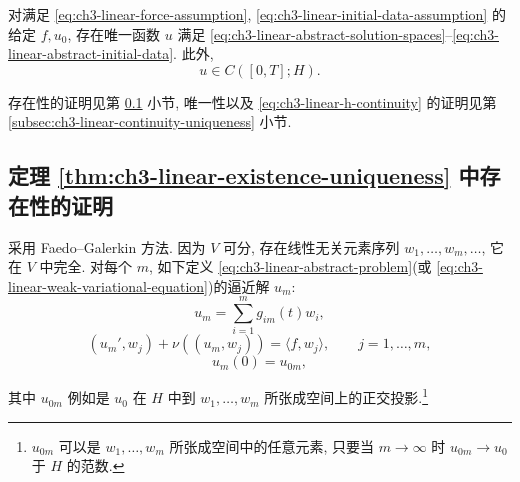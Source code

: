 \begin{Theorem}
\label{thm:ch3-linear-existence-uniqueness}
对满足 \eqref{eq:ch3-linear-force-assumption}, \eqref{eq:ch3-linear-initial-data-assumption} 的给定 $f,u_0$, 存在唯一函数 $u$ 满足 \eqref{eq:ch3-linear-abstract-solution-spaces}--\eqref{eq:ch3-linear-abstract-initial-data}. 此外,
\begin{equation}
u\in C([0,T];H).
\label{eq:ch3-linear-h-continuity}
\end{equation}
\end{Theorem}

存在性的证明见第 \ref{subsec:ch3-linear-existence-proof} 小节, 唯一性以及 \eqref{eq:ch3-linear-h-continuity} 的证明见第 \ref{subsec:ch3-linear-continuity-uniqueness} 小节.

\subsection{定理 \ref{thm:ch3-linear-existence-uniqueness} 中存在性的证明}
\label{subsec:ch3-linear-existence-proof}
采用 Faedo--Galerkin 方法. 因为 $V$ 可分, 存在线性无关元素序列 $w_1,\ldots,w_m,\ldots$, 它在 $V$ 中完全. 对每个 $m$, 如下定义 \eqref{eq:ch3-linear-abstract-problem}(或 \eqref{eq:ch3-linear-weak-variational-equation})的逼近解 $u_m$:
\begin{equation}
u_m=\sum_{i=1}^{m}g_{im}(t)w_i,
\label{eq:ch3-linear-galerkin-expansion}
\end{equation}
\begin{equation}
(u_m',w_j)+\nu((u_m,w_j))=\langle f,w_j\rangle,
\qquad j=1,\ldots,m,
\label{eq:ch3-linear-galerkin-equations}
\end{equation}
\begin{equation}
u_m(0)=u_{0m},
\label{eq:ch3-linear-galerkin-initial-condition}
\end{equation}

\hypertarget{chapter-03-page-188}{}
其中 $u_{0m}$ 例如是 $u_0$ 在 $H$ 中到 $w_1,\ldots,w_m$ 所张成空间上的正交投影.\footnote{$u_{0m}$ 可以是 $w_1,\ldots,w_m$ 所张成空间中的任意元素, 只要当 $m\to\infty$ 时 $u_{0m}\to u_0$ 于 $H$ 的范数.}

